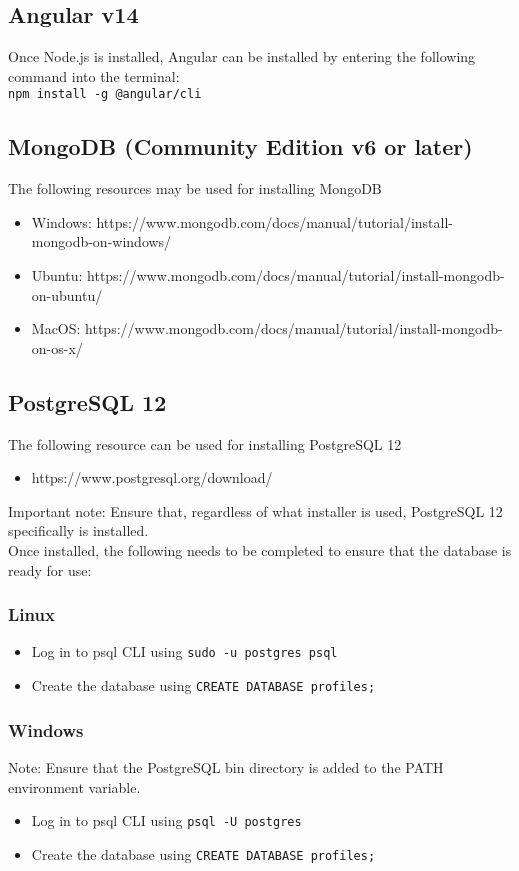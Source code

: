 \documentclass[12pt]{article}
\begin{document}
\subsection{Angular v14}
Once Node.js is installed, Angular can be installed by entering the following command into the terminal:\\
\texttt{npm install -g @angular/cli}

\subsection{MongoDB (Community Edition v6 or later)}
The following resources may be used for installing MongoDB
\begin{itemize}
    \item Windows: https://www.mongodb.com/docs/manual/tutorial/install-mongodb-on-windows/
    \item Ubuntu: https://www.mongodb.com/docs/manual/tutorial/install-mongodb-on-ubuntu/
    \item MacOS: https://www.mongodb.com/docs/manual/tutorial/install-mongodb-on-os-x/
\end{itemize}

\subsection{PostgreSQL 12}
The following resource can be used for installing PostgreSQL 12
\begin{itemize}
    \item https://www.postgresql.org/download/
\end{itemize}
Important note: Ensure that, regardless of what installer is used, PostgreSQL 12 specifically is installed.\\
Once installed, the following needs to be completed to ensure that the database is ready for use:
\subsubsection*{Linux}
\begin{itemize}
    \item Log in to psql CLI using \texttt{sudo -u postgres psql}
    \item Create the database using \texttt{CREATE DATABASE profiles;}
\end{itemize}

\subsubsection*{Windows}
Note: Ensure that the PostgreSQL bin directory is added to the PATH environment variable.\\
\begin{itemize}
    \item Log in to psql CLI using \texttt{psql -U postgres}
    \item Create the database using \texttt{CREATE DATABASE profiles;}
\end{itemize}
\end{document}
